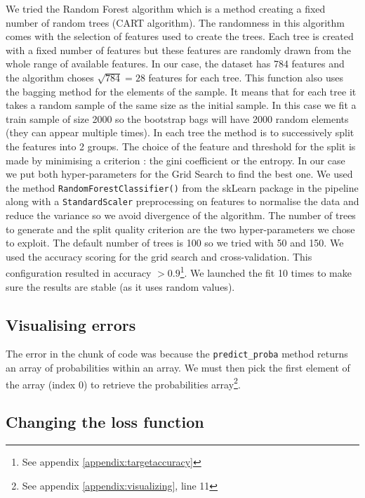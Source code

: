 We tried the Random Forest algorithm which is a method creating a fixed number of random trees (CART algorithm). The randomness in this algorithm comes with the selection of features used to create the trees. Each tree is created with a fixed number of features but these features are randomly drawn from the whole range of available features. In our case, the dataset has 784 features and the algorithm choses $\sqrt{784} = 28$ features for each tree. This function also uses the bagging method for the elements of the sample. It means that for each tree it takes a random sample of the same size as the initial sample. In this case we fit a train sample of size 2000 so the bootstrap bags will have 2000 random elements (they can appear multiple times). In each tree the method is to successively split the features into 2 groups. The choice of the feature and threshold for the split is made by minimising a criterion : the gini coefficient or the entropy. In our case we put both hyper-parameters for the Grid Search to find the best one. 
We used the method \verb|RandomForestClassifier()| from the skLearn package in the pipeline along with a \verb|StandardScaler| preprocessing on features to normalise the data and reduce the variance so we avoid divergence of the algorithm. The number of trees to generate and the split quality criterion are the two hyper-parameters we chose to exploit. The default number of trees is 100 so we tried with 50 and 150. We used the accuracy scoring for the grid search and cross-validation. This configuration resulted in accuracy $>0.9$\footnote{See appendix \ref{appendix:targetaccuracy}}. We launched the fit 10 times to make sure the results are stable (as it uses random values). 

\subsection{Visualising errors}
The error in the chunk of code was because the \verb|predict_proba| method returns an array of probabilities within an array. We must then pick the first element of the array (index 0) to retrieve the probabilities array\footnote{See appendix \ref{appendix:visualizing}, line 11}.\\

\subsection{Changing the loss function}

